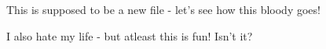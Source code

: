 This is supposed to be a new file - let's see how this bloody goes! 

I also hate my life - but atleast this is fun! Isn't it? 

